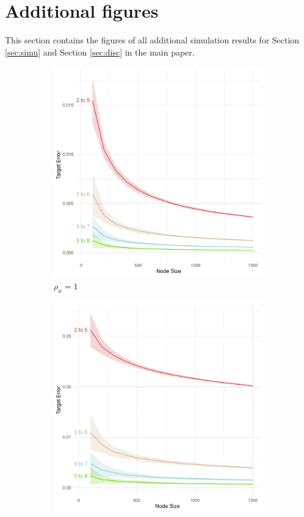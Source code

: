 \documentclass[10pt,journal,compsoc]{IEEEtran}
\numberwithin{equation}{section}
\begin{document}
\section{Additional figures}\label{sec:addfigure}
This section contains the figures of all additional simulation results for Section \ref{sec:simu} and Section \ref{sec:disc} in the main paper.
\begin{figure}
\begin{subfigure}{.23\columnwidth}
\includegraphics[width=\columnwidth]{MM_d_3.pdf}%
\caption{$\rho_n = 1$}
\end{subfigure}\hfill
\begin{subfigure}{.23\columnwidth}
\includegraphics[width=\columnwidth]{MM_13_3.pdf}%

\end{subfigure}
\end{figure}
\end{document}
